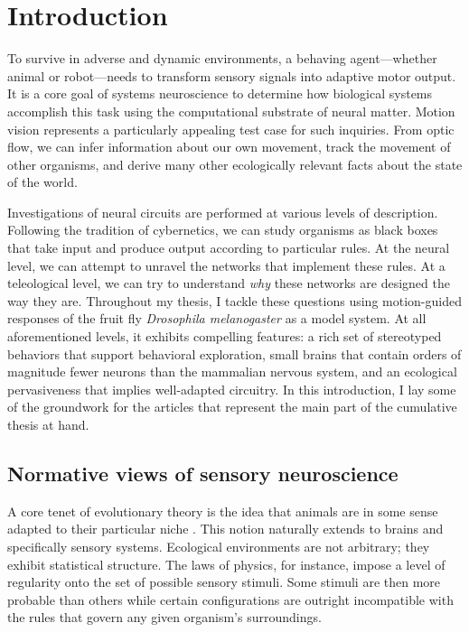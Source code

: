 \chapter{Introduction}
\label{chp:introduction}

To survive in adverse and dynamic environments, a behaving agent---whether animal or robot---needs to transform sensory signals into adaptive motor output. It is a core goal of systems neuroscience to determine how biological systems accomplish this task using the computational substrate of neural matter. Motion vision represents a particularly appealing test case for such inquiries. From optic flow, we can infer information about our own movement, track the movement of other organisms, and derive many other ecologically relevant facts about the state of the world.

Investigations of neural circuits are performed at various levels of description. Following the tradition of cybernetics, we can study organisms as black boxes that take input and produce output according to particular rules. At the neural level, we can attempt to unravel the networks that implement these rules. At a teleological level, we can try to understand \textit{why} these networks are designed the way they are. Throughout my thesis, I tackle these questions using motion-guided responses of the fruit fly \textit{Drosophila melanogaster} as a model system. At all aforementioned levels, it exhibits compelling features: a rich set of stereotyped behaviors that support behavioral exploration, small brains that contain orders of magnitude fewer neurons than the mammalian nervous system, and an ecological pervasiveness that implies well-adapted circuitry. In this introduction, I lay some of the groundwork for the articles that represent the main part of the cumulative thesis at hand.


\section{Normative views of sensory neuroscience}

A core tenet of evolutionary theory is the idea that animals are in some sense adapted to their particular niche \citep{Darwin:1859aa}. This notion naturally extends to brains and specifically sensory systems. Ecological environments are not arbitrary; they exhibit statistical structure. The laws of physics, for instance, impose a level of regularity onto the set of possible sensory stimuli. Some stimuli are then more probable than others while certain configurations are outright incompatible with the rules that govern any given organism's surroundings.

